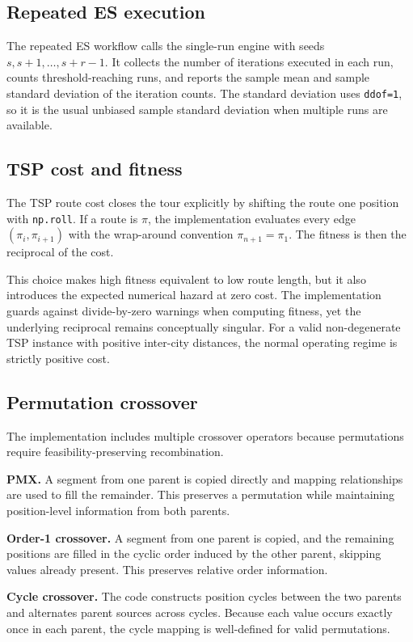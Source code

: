 \documentclass[11pt,a4paper]{article}
\newcommand{\code}[1]{\texttt{#1}}
\begin{document}
\subsection{Repeated ES execution}
The repeated ES workflow calls the single-run engine with seeds $s,s+1,\ldots,s+r-1$. It collects the number of iterations executed in each run, counts threshold-reaching runs, and reports the sample mean and sample standard deviation of the iteration counts. The standard deviation uses \code{ddof=1}, so it is the usual unbiased sample standard deviation when multiple runs are available.

\subsection{TSP cost and fitness}
The TSP route cost closes the tour explicitly by shifting the route one position with \code{np.roll}. If a route is $\pi$, the implementation evaluates every edge $(\pi_i,\pi_{i+1})$ with the wrap-around convention $\pi_{n+1}=\pi_1$. The fitness is then the reciprocal of the cost.

This choice makes high fitness equivalent to low route length, but it also introduces the expected numerical hazard at zero cost. The implementation guards against divide-by-zero warnings when computing fitness, yet the underlying reciprocal remains conceptually singular. For a valid non-degenerate TSP instance with positive inter-city distances, the normal operating regime is strictly positive cost.

\subsection{Permutation crossover}
The implementation includes multiple crossover operators because permutations require feasibility-preserving recombination.

\textbf{PMX.} A segment from one parent is copied directly and mapping relationships are used to fill the remainder. This preserves a permutation while maintaining position-level information from both parents.

\textbf{Order-1 crossover.} A segment from one parent is copied, and the remaining positions are filled in the cyclic order induced by the other parent, skipping values already present. This preserves relative order information.

\textbf{Cycle crossover.} The code constructs position cycles between the two parents and alternates parent sources across cycles. Because each value occurs exactly once in each parent, the cycle mapping is well-defined for valid permutations.
\end{document}
